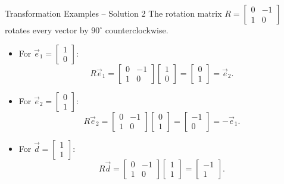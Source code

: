 \documentclass{beamer}
\begin{document}
\begin{frame}{Transformation Examples -- Solution 2}
  The rotation matrix \(R = \begin{bmatrix} 0 & -1 \\ 1 & 0 \end{bmatrix}\) rotates every vector by \(90^\circ\) counterclockwise.
  \begin{itemize}
    \item For \(\vec{e}_1 = \begin{bmatrix} 1 \\ 0 \end{bmatrix}\):
    \begin{equation}
      R\vec{e}_1 = \begin{bmatrix} 0 & -1 \\ 1 & 0 \end{bmatrix}\begin{bmatrix} 1 \\ 0 \end{bmatrix} = \begin{bmatrix} 0 \\ 1 \end{bmatrix} = \vec{e}_2.
    \end{equation}
    \item For \(\vec{e}_2 = \begin{bmatrix} 0 \\ 1 \end{bmatrix}\):
    \begin{equation}
      R\vec{e}_2 = \begin{bmatrix} 0 & -1 \\ 1 & 0 \end{bmatrix}\begin{bmatrix} 0 \\ 1 \end{bmatrix} = \begin{bmatrix} -1 \\ 0 \end{bmatrix} = -\vec{e}_1.
    \end{equation}
    \item For \(\vec{d} = \begin{bmatrix} 1 \\ 1 \end{bmatrix}\):
    \begin{equation}
      R\vec{d} = \begin{bmatrix} 0 & -1 \\ 1 & 0 \end{bmatrix}\begin{bmatrix} 1 \\ 1 \end{bmatrix} = \begin{bmatrix} -1 \\ 1 \end{bmatrix}.
    \end{equation}
  \end{itemize}
\end{frame}
\end{document}
